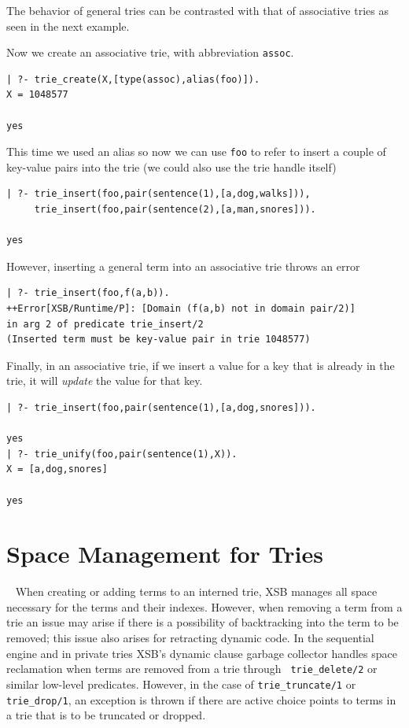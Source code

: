 The behavior of general tries can be contrasted with that of
associative tries as seen in the next example.
\begin{example} \rm
Now we create an associative trie, with abbreviation
{\tt assoc}.
{\small
\begin{verbatim}
| ?- trie_create(X,[type(assoc),alias(foo)]).
X = 1048577

yes
\end{verbatim}
}  \noindent
%
This time we used an alias so now we can use {\tt foo} to refer to
insert a couple of key-value pairs into the trie (we could also use
the trie handle itself) 
{\small
\begin{verbatim}
| ?- trie_insert(foo,pair(sentence(1),[a,dog,walks])), 
     trie_insert(foo,pair(sentence(2),[a,man,snores])).

yes
\end{verbatim}
} \noindent
However, inserting a general term into an associative trie throws an
error
{\small
\begin{verbatim}
| ?- trie_insert(foo,f(a,b)).
++Error[XSB/Runtime/P]: [Domain (f(a,b) not in domain pair/2)]  
in arg 2 of predicate trie_insert/2 
(Inserted term must be key-value pair in trie 1048577)
\end{verbatim}
}  \noindent
Finally, in an associative trie, if we insert a value for a key that
is already in the trie, it will {\em update} the value for that key.
{\small
\begin{verbatim}
| ?- trie_insert(foo,pair(sentence(1),[a,dog,snores])).

yes
| ?- trie_unify(foo,pair(sentence(1),X)).
X = [a,dog,snores]

yes
\end{verbatim}
}

\end{example}

\section{Space Management for Tries}~\label{sec:trie-gc}
%
When creating or adding terms to an interned trie, XSB manages all
space necessary for the terms and their indexes.  However, when
removing a term from a trie an issue may arise if there is a
possibility of backtracking into the term to be removed; this issue
also arises for retracting dynamic code.  In the sequential engine and
in private tries XSB's dynamic clause garbage collector handles space
reclamation when terms are removed from a trie through {\tt
  trie\_delete/2} or similar low-level predicates.  However, in the
case of {\tt trie\_truncate/1} or {\tt trie\_drop/1}, an exception is
thrown if there are active choice points to terms in a trie that is to
be truncated or dropped.

